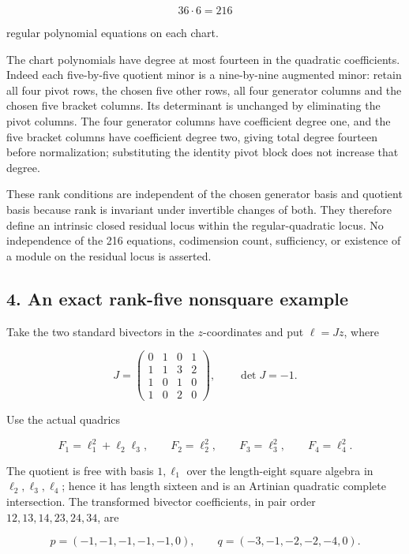 \[
 36\cdot6=216
 \tag{E839.9}
\]

regular polynomial equations on each chart.

The chart polynomials have degree at most fourteen in the quadratic
coefficients. Indeed each five-by-five quotient minor is a nine-by-nine
augmented minor: retain all four pivot rows, the chosen five other rows,
all four generator columns and the chosen five bracket columns. Its
determinant is unchanged by eliminating the pivot columns. The four
generator columns have coefficient degree one, and the five bracket
columns have coefficient degree two, giving total degree fourteen before
normalization; substituting the identity pivot block does not increase
that degree.

These rank conditions are independent of the chosen generator basis and
quotient basis because rank is invariant under invertible changes of
both. They therefore define an intrinsic closed residual locus within
the regular-quadratic locus. No independence of the 216 equations,
codimension count, sufficiency, or existence of a module on the residual
locus is asserted.

\subsection{4. An exact rank-five nonsquare
example}\label{SF-E839:an-exact-rank-five-nonsquare-example}

Take the two standard bivectors in the \(z\)-coordinates and put
\(\ell=Jz\), where

\[
 J=\begin{pmatrix}
 0&1&0&1\\
 1&1&3&2\\
 1&0&1&0\\
 1&0&2&0
 \end{pmatrix},\qquad \det J=-1.
 \tag{E839.10}
\]

Use the actual quadrics

\[
 F_1=\ell_1^2+\ell_2\ell_3,\qquad
 F_2=\ell_2^2,\qquad F_3=\ell_3^2,\qquad F_4=\ell_4^2.
 \tag{E839.11}
\]

The quotient is free with basis \(1,\ell_1\) over the length-eight
square algebra in \(\ell_2,\ell_3,\ell_4\); hence it has length sixteen
and is an Artinian quadratic complete intersection. The transformed
bivector coefficients, in pair order \(12,13,14,23,24,34\), are

\[
 p=(-1,-1,-1,-1,-1,0),\qquad
 q=(-3,-1,-2,-2,-4,0).
 \tag{E839.12}
\]

